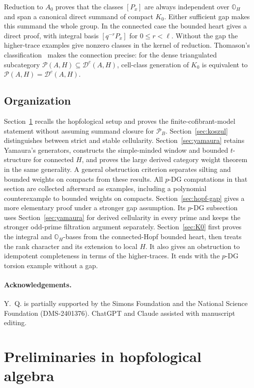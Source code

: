 \documentclass[11pt]{article}
\theoremstyle{definition}
\numberwithin{equation}{section}
\newcommand{\Pun}{\mathcal{P}_B}
\newcommand{\Tcat}{\mathcal{P}(A,H)}
\newcommand{\Dc}{\mathcal{D}^c(A,H)}
\begin{document}
Reduction to $A_0$ proves that the classes $[P_x]$ are always independent
over $\mathbb O_H$ and span a canonical direct summand of compact $K_0$.
Either sufficient gap makes this summand the whole group.  In the
connected case the bounded heart gives a direct proof, with integral
basis $[q^{-r}P_x]$ for $0\le r<\ell$.  Without the
gap the higher-trace examples give nonzero classes in the kernel of
reduction.  Thomason's classification~\cite{Thomason} makes the connection
precise: for the dense triangulated subcategory $\Tcat\subseteq\Dc$,
cell-class generation of $K_0$ is equivalent to $\Tcat=\Dc$.

\subsection{Organization}
Section~\ref{sec:prelim} recalls the hopfological setup and proves the
finite-cofibrant-model statement without assuming summand closure for
$\Pun$.  Section~\ref{sec:koszul} distinguishes between strict and stable
cellularity.  Section~\ref{sec:yamaura} retains Yamaura's generators,
constructs the simple-minded window and bounded $t$-structure for
connected $H$, and proves the large derived category weight theorem in the same
generality.  A general obstruction criterion separates silting and
bounded weights on compacts from these results.  All $p$-DG computations
in that section are collected afterward as examples, including a
polynomial counterexample to bounded weights on compacts.
Section~\ref{sec:hopf-gap} gives a more elementary proof under a stronger
gap assumption.  Its $p$-DG subsection
uses Section~\ref{sec:yamaura} for derived cellularity in every prime
and keeps the stronger odd-prime filtration argument separately.
Section~\ref{sec:K0} first proves the integral and $\mathbb O_H$-bases
from the connected-Hopf bounded heart, then treats the rank character
and its extension to local $H$. It also gives an obstruction to idempotent completeness in terms of the higher-traces.  It ends with the $p$-DG torsion example
without a gap.

\paragraph{Acknowledgements.} Y.~Q. is partially supported by the Simons
Foundation and the National Science Foundation (DMS-2401376). ChatGPT and Claude
assisted with manuscript editing.

\section{Preliminaries in hopfological algebra}
\label{sec:prelim}
\end{document}
